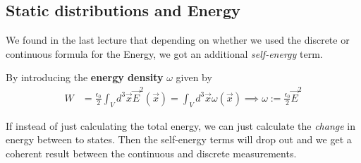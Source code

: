 \subsection{Static distributions and Energy}
We found in the last lecture that depending on whether we used the discrete or continuous formula for the Energy, we got an additional \emph{self-energy} term.

By introducing the \textbf{energy density} $\omega$ given by
\begin{align*}
  W &= \frac{\epsilon_0}{2} \int_V d^{3}\vec{x} \vec{E}^2(\vec{x}) = \int_V d^{3} \vec{x} \omega(\vec{x}) 
  \implies
  \omega := \frac{\epsilon_0}{2}\vec{E}^{2}
\end{align*}

If instead of just calculating the total energy, we can just calculate the \emph{change} in energy between to states. 
Then the self-energy terms will drop out and we get a coherent result between the continuous and discrete measurements.


